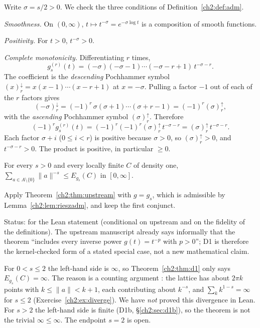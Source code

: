 \begin{humanproof}
Write $\sigma=s/2>0$. We check the three conditions of Definition~\ref{ch2:def:adm}.

\emph{Smoothness.} On $(0,\infty)$, $t\mapsto t^{-\sigma}=e^{-\sigma\log t}$ is a composition of smooth functions.

\emph{Positivity.} For $t>0$, $t^{-\sigma}>0$.

\emph{Complete monotonicity.} Differentiating $r$ times,
\[
g_s^{(r)}(t)=(-\sigma)(-\sigma-1)\cdots(-\sigma-r+1)\,t^{-\sigma-r}.
\]
The coefficient is the \emph{descending} Pochhammer symbol $(x)_r^{\downarrow}=x(x-1)\cdots(x-r+1)$ at $x=-\sigma$.
Pulling a factor $-1$ out of each of the $r$ factors gives
\[
(-\sigma)_r^{\downarrow}=(-1)^r\,\sigma(\sigma+1)\cdots(\sigma+r-1)=(-1)^r(\sigma)_r^{\uparrow},
\]
with the \emph{ascending} Pochhammer symbol $(\sigma)_r^{\uparrow}$. Therefore
\[
(-1)^r g_s^{(r)}(t)=(-1)^r(-1)^r(\sigma)_r^{\uparrow}\,t^{-\sigma-r}=(\sigma)_r^{\uparrow}\,t^{-\sigma-r}.
\]
Each factor $\sigma+i$ ($0\le i<r$) is positive because $\sigma>0$, so $(\sigma)_r^{\uparrow}>0$, and $t^{-\sigma-r}>0$.
The product is positive, in particular $\ge0$.
\end{humanproof}

\begin{theorem}\label{ch2:thm:d1}
For every $s>0$ and every locally finite $C$ of density one, $\sum_{a\in A\setminus\{0\}}\|a\|^{-s}\le E_{g_s}(C)$ in
$[0,\infty]$.
\end{theorem}

\begin{humanproof}
Apply Theorem~\ref{ch2:thm:upstream} with $g=g_s$, which is admissible by Lemma~\ref{ch2:lem:rieszadm}, and keep the first
conjunct.
\end{humanproof}

Status: \tierA{} for the Lean statement (conditional on upstream and on the fidelity of the definitions). The upstream
manuscript already says informally that the theorem ``includes every inverse power $g(t)=t^{-p}$ with $p>0$''; D1 is
therefore the kernel-checked form of a stated special case, not a new mathematical claim.

\begin{warnbox}
For $0<s\le2$ the left-hand side is $\infty$, so Theorem~\ref{ch2:thm:d1} only says $E_{g_s}(C)=\infty$.
The reason is a counting argument \tierC: the lattice has about $2\pi k$ points with $k\le\|a\|<k+1$, each contributing
about $k^{-s}$, and $\sum_k k^{1-s}=\infty$ for $s\le2$ (Exercise~\ref{ch2:ex:diverge}). We have \emph{not} proved this
divergence in Lean. For $s>2$ the left-hand side is finite (D1b, \S\ref{ch2:sec:d1b}), so the theorem is not the
trivial $\infty\le\infty$. The endpoint $s=2$ is open.
\end{warnbox}

